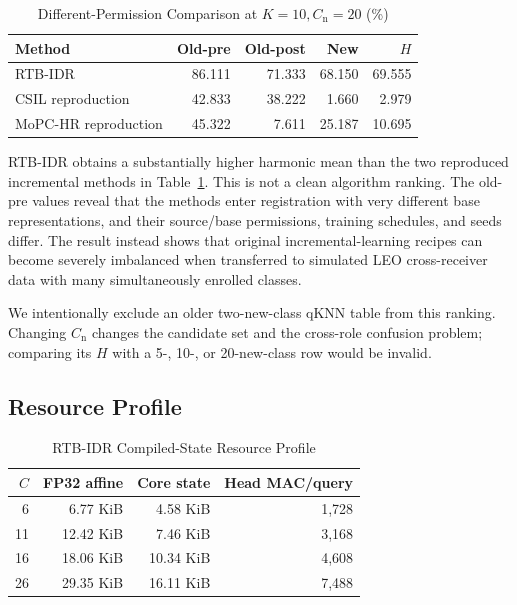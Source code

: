 \documentclass[journal]{IEEEtran}
\newcommand{\stagehead}{RTB-IDR}
\begin{document}
\begin{table}[t]
\caption{Different-Permission Comparison at \(K=10,C_{\mathrm{n}}=20\) (\%)}
\label{tab:external}
\centering
\footnotesize
\setlength{\tabcolsep}{3pt}
\begin{tabular}{lrrrr}
\toprule
Method & Old-pre & Old-post & New & \(H\) \\
\midrule
\stagehead{} & 86.111 & 71.333 & 68.150 & 69.555 \\
CSIL reproduction & 42.833 & 38.222 & 1.660 & 2.979 \\
MoPC-HR reproduction & 45.322 & 7.611 & 25.187 & 10.695 \\
\bottomrule
\end{tabular}
\end{table}

\stagehead{} obtains a substantially higher harmonic mean than the two reproduced incremental methods in Table~\ref{tab:external}. This is not a clean algorithm ranking. The old-pre values reveal that the methods enter registration with very different base representations, and their source/base permissions, training schedules, and seeds differ. The result instead shows that original incremental-learning recipes can become severely imbalanced when transferred to simulated LEO cross-receiver data with many simultaneously enrolled classes.

We intentionally exclude an older two-new-class qKNN table from this ranking. Changing \(C_{\mathrm{n}}\) changes the candidate set and the cross-role confusion problem; comparing its \(H\) with a 5-, 10-, or 20-new-class row would be invalid.

\subsection{Resource Profile}

\begin{table}[t]
\caption{\stagehead{} Compiled-State Resource Profile}
\label{tab:resource}
\centering
\footnotesize
\begin{tabular}{rrrr}
\toprule
\(C\) & FP32 affine & Core state & Head MAC/query \\
\midrule
6  & 6.77 KiB  & 4.58 KiB  & 1,728 \\
11 & 12.42 KiB & 7.46 KiB  & 3,168 \\
16 & 18.06 KiB & 10.34 KiB & 4,608 \\
26 & 29.35 KiB & 16.11 KiB & 7,488 \\
\bottomrule
\end{tabular}
\end{table}
\end{document}
